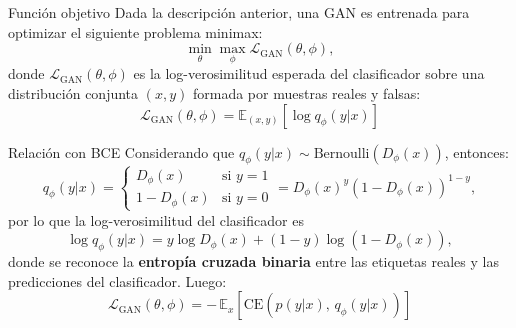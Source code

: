 \documentclass{beamer}
\begin{document}
\begin{frame}{Función objetivo}
    Dada la descripción anterior, una GAN es entrenada para optimizar el siguiente problema minimax:
    \begin{equation*}
        \min_\theta \max_\phi
        \mathcal{L}_\text{GAN}(\theta,\phi),
    \end{equation*}
    donde $\mathcal{L}_\text{GAN}(\theta,\phi)$ es la log-verosimilitud esperada del clasificador sobre una distribución conjunta $(x,y)$ formada por muestras reales y falsas:
    \begin{equation*}
        \mathcal{L}_\text{GAN}(\theta,\phi)
        =\mathbb{E}_{(x,y)}\left[\log q_\phi(y|x)\right]
    \end{equation*}
\end{frame}

\begin{frame}{Relación con BCE}
    Considerando que $q_\phi(y| x)\sim\text{Bernoulli}(D_\phi(x))$, entonces:
    \begin{equation*}
        q_\phi(y|x)=
        \begin{cases}
            D_\phi(x)   & \text{si } y=1 \\
            1-D_\phi(x) & \text{si }y=0
        \end{cases}
        =D_\phi(x)^y \left(1-D_\phi(x)\right)^{1-y},
    \end{equation*}
    por lo que la log-verosimilitud del clasificador es
    \begin{equation*}
        \log q_\phi(y|x)=y\log D_\phi(x)+(1-y)\log\left(1-D_\phi(x)\right),
    \end{equation*}
    donde se reconoce la \textbf{entropía cruzada binaria} entre las etiquetas reales y las predicciones del clasificador. Luego:
    \begin{equation*}
        \mathcal{L}_\text{GAN}(\theta,\phi)
        =-\,\mathbb{E}_{x}\left[\text{CE}\left(p(y|x),\,q_\phi(y|x)\right)\right]
    \end{equation*}
\end{frame}
\end{document}
